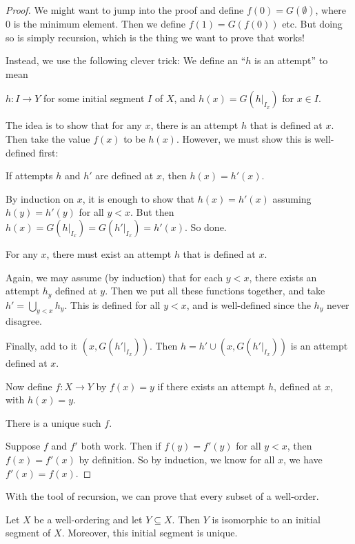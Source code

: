 \documentclass[a4paper]{article}
\begin{document}
\begin{proof}
  We might want to jump into the proof and define $f(0) = G(\emptyset)$, where $0$ is the minimum element. Then we define $f(1) = G(f(0))$ etc. But doing so is simply recursion, which is the thing we want to prove that works!

  Instead, we use the following clever trick: We define an ``$h$ is an attempt'' to mean
  \begin{center}
    $h: I \to Y$ for some initial segment $I$ of $X$, and $h(x) = G(h|_{I_x})$ for $x\in I$.
  \end{center}
  The idea is to show that for any $x$, there is an attempt $h$ that is defined at $x$. Then take the value $f(x)$ to be $h(x)$. However, we must show this is well-defined first:

  \begin{claim}
    If attempts $h$ and $h'$ are defined at $x$, then $h(x) = h'(x)$.
  \end{claim}
  By induction on $x$, it is enough to show that $h(x) = h'(x)$ assuming $h(y) = h'(y)$ for all $y < x$. But then $h(x) = G(h|_{I_x}) = G(h'|_{I_x}) = h'(x)$. So done.

  \begin{claim}
    For any $x$, there must exist an attempt $h$ that is defined at $x$.
  \end{claim}
  Again, we may assume (by induction) that for each $y < x$, there exists an attempt $h_y$ defined at $y$. Then we put all these functions together, and take $h' = \bigcup_{y < x} h_y$. This is defined for all $y < x$, and is well-defined since the $h_y$ never disagree.

  Finally, add to it $(x, G(h'|_{I_x}))$. Then $h = h'\cup (x, G(h'|_{I_x}))$ is an attempt defined at $x$.

  Now define $f:X\to Y$ by $f(x) = y$ if there exists an attempt $h$, defined at $x$, with $h(x) = y$.

  \begin{claim}
    There is a unique such $f$.
  \end{claim}
  Suppose $f$ and $f'$ both work. Then if $f(y) = f'(y)$ for all $y < x$, then $f(x) = f'(x)$ by definition. So by induction, we know for all $x$, we have $f'(x) = f(x)$.
\end{proof}
With the tool of recursion, we can prove that every subset of a well-order.

\begin{lemma}
  Let $X$ be a well-ordering and let $Y\subseteq X$. Then $Y$ is isomorphic to an initial segment of $X$. Moreover, this initial segment is unique.
\end{lemma}
\end{document}

